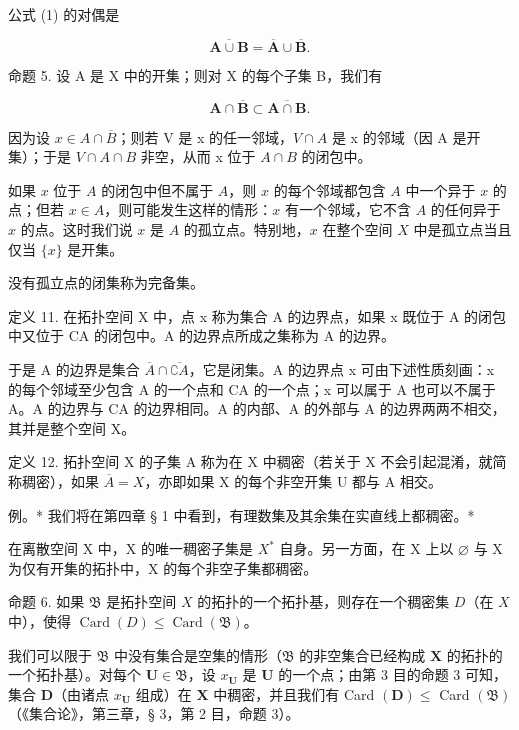 公式 (1) 的对偶是

\[
\overline {{{\mathbf {A} \cup \mathbf {B}}}} = \overline {{{\mathbf {A}}}} \cup \overline {{{\mathbf {B}}}}.\tag{3}
\]

命题 5. 设 A 是 X 中的开集；则对 X 的每个子集 B，我们有

\[
\mathbf {A} \cap \overline {{\mathbf {B}}} \subset \overline {{\mathbf {A} \cap \mathbf {B}}}.\tag{4}
\]

因为设 \(x \in A \cap \overline{B}\)；则若 V 是 x 的任一邻域，\(V \cap A\) 是 x 的邻域（因 A 是开集）；于是 \(V \cap A \cap B\) 非空，从而 x 位于 \(A \cap B\) 的闭包中。

如果 \(x\) 位于 \(A\) 的闭包中但不属于 \(A\)，则 \(x\) 的每个邻域都包含 \(A\) 中一个异于 \(x\) 的点；但若 \(x \in A\)，则可能发生这样的情形：\(x\) 有一个邻域，它不含 \(A\) 的任何异于 \(x\) 的点。这时我们说 \(x\) 是 \(A\) 的孤立点。特别地，\(x\) 在整个空间 \(X\) 中是孤立点当且仅当 \(\{x\}\) 是开集。

没有孤立点的闭集称为完备集。

定义 11. 在拓扑空间 X 中，点 x 称为集合 A 的边界点，如果 x 既位于 A 的闭包中又位于 CA 的闭包中。A 的边界点所成之集称为 A 的边界。

于是 A 的边界是集合 \(\overline{A} \cap \overline{\complement A}\)，它是闭集。A 的边界点 x 可由下述性质刻画：x 的每个邻域至少包含 A 的一个点和 CA 的一个点；x 可以属于 A 也可以不属于 A。A 的边界与 CA 的边界相同。A 的内部、A 的外部与 A 的边界两两不相交，其并是整个空间 X。

定义 12. 拓扑空间 X 的子集 A 称为在 X 中稠密（若关于 X 不会引起混淆，就简称稠密），如果 \(\overline{A} = X\)，亦即如果 X 的每个非空开集 U 都与 A 相交。

例。* 我们将在第四章 § 1 中看到，有理数集及其余集在实直线上都稠密。*

在离散空间 X 中，X 的唯一稠密子集是 \(X^{*}\) 自身。另一方面，在 X 上以 \(\varnothing\) 与 X 为仅有开集的拓扑中，X 的每个非空子集都稠密。

命题 6. 如果 \(\mathfrak{B}\) 是拓扑空间 \(X\) 的拓扑的一个拓扑基，则存在一个稠密集 \(D\)（在 \(X\) 中），使得 \(\operatorname{Card}(D) \leqslant \operatorname{Card}(\mathfrak{B})\)。

我们可以限于 \(\mathfrak{B}\) 中没有集合是空集的情形（\(\mathfrak{B}\) 的非空集合已经构成 \(\mathbf{X}\) 的拓扑的一个拓扑基）。对每个 \(\mathbf{U} \in \mathfrak{B}\)，设 \(x_{\mathbf{U}}\) 是 \(\mathbf{U}\) 的一个点；由第 3 目的命题 3 可知，集合 \(\mathbf{D}\)（由诸点 \(x_{\mathbf{U}}\) 组成）在 \(\mathbf{X}\) 中稠密，并且我们有 Card \((\mathbf{D}) \leqslant\) Card \((\mathfrak{B})\)（《集合论》，第三章，§ 3，第 2 目，命题 3）。

